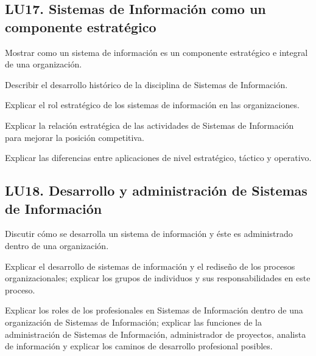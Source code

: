 \subsection{LU17. Sistemas de Información como un componente estratégico}\label{sec:LU17}
\begin{LearningUnit}
\begin{LUGoal}
\item Mostrar como un sistema de información es un componente estratégico e integral de una organización.
\end{LUGoal}

\begin{LUObjective}
\item Describir el desarrollo histórico de la disciplina de Sistemas de Información.
\item Explicar el rol estratégico de los sistemas de información en las organizaciones.
\item Explicar la relación estratégica de las actividades de Sistemas de Información para mejorar la posición competitiva.
\item Explicar las diferencias entre aplicaciones de nivel estratégico, táctico y operativo.
\end{LUObjective}
\end{LearningUnit}

\subsection{LU18. Desarrollo y administración de Sistemas de Información}\label{sec:LU18}
\begin{LearningUnit}
\begin{LUGoal}
\item Discutir cómo se desarrolla un sistema de información y éste es administrado dentro de una organización.
\end{LUGoal}

\begin{LUObjective}
\item Explicar el desarrollo de sistemas de información y el rediseño de los procesos organizacionales; explicar los grupos de individuos y sus responsabilidades en este proceso.
\item Explicar los roles de los profesionales en Sistemas de Información dentro de una organización de Sistemas de Información; explicar las funciones de la administración de Sistemas de Información, administrador de proyectos, analista de información y explicar los caminos de desarrollo profesional posibles.
\end{LUObjective}
\end{LearningUnit}

